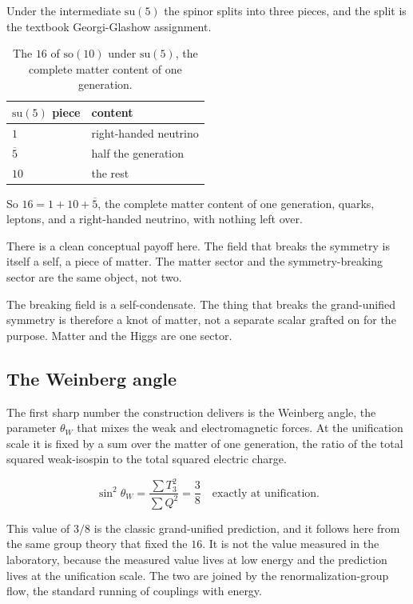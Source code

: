 Under the intermediate $\mathrm{su}(5)$ the spinor splits into three pieces, and the split is the textbook Georgi-Glashow assignment.

\begin{table}[ht]
\centering
\begin{tabular}{@{}ll@{}}
\toprule
$\mathrm{su}(5)$ piece & content \\
\midrule
$1$ & right-handed neutrino \\
$\overline{5}$ & half the generation \\
$10$ & the rest \\
\bottomrule
\end{tabular}
\caption{The $16$ of $\mathrm{so}(10)$ under $\mathrm{su}(5)$, the complete matter content of one generation.}
\label{tab:su5-split}
\end{table}

So $16 = 1 + 10 + \overline{5}$, the complete matter content of one generation, quarks, leptons, and a right-handed neutrino, with nothing left over.

There is a clean conceptual payoff here. The field that breaks the symmetry is itself a self, a piece of matter. The matter sector and the symmetry-breaking sector are the same object, not two.

\begin{principle}
The breaking field is a self-condensate. The thing that breaks the grand-unified symmetry is therefore a knot of matter, not a separate scalar grafted on for the purpose. Matter and the Higgs are one sector.
\end{principle}

\subsection{The Weinberg angle}

The first sharp number the construction delivers is the Weinberg angle, the parameter $\theta_W$ that mixes the weak and electromagnetic forces. At the unification scale it is fixed by a sum over the matter of one generation, the ratio of the total squared weak-isospin to the total squared electric charge.

\[
\sin^2 \theta_W = \frac{\sum T_3^2}{\sum Q^2} = \frac{3}{8} \quad \text{exactly at unification.}
\]

This value of $3/8$ is the classic grand-unified prediction, and it follows here from the same group theory that fixed the $16$. It is not the value measured in the laboratory, because the measured value lives at low energy and the prediction lives at the unification scale. The two are joined by the renormalization-group flow, the standard running of couplings with energy.

